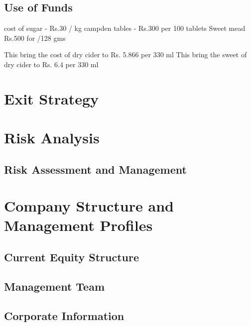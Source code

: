 \documentclass[11pt]{article}
\begin{document}
  \subsection{Use of Funds}
   
cost of sugar -  Rs.30 / kg
campden tables  - Rs.300 per 100 tablets
Sweet mead Rs.500 for /128 gms 


This bring the cost of dry cider to Rs. 5.866 per 330 ml
This bring the sweet of dry cider to Rs. 6.4 per 330 ml
\section{Exit Strategy}
\section{Risk Analysis}
  \subsection{Risk Assessment and Management}
\section{Company Structure and Management Profiles}
  \subsection{Current Equity Structure}
  \subsection{Management Team}
  \subsection{Corporate Information}
\end{document}
